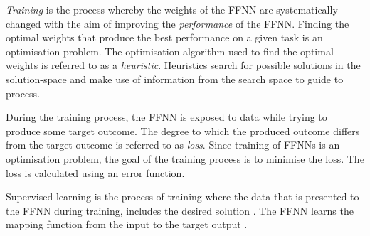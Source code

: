 \textit{Training} is the process whereby the weights of the \acs{FFNN} are systematically changed with the aim of improving the \textit{performance} of the \acs{FFNN}. Finding the optimal weights that produce the best performance on a given task is an optimisation problem. The optimisation algorithm used to find the optimal weights is referred to as a \textit{heuristic}. Heuristics search for possible solutions in the solution-space and make use of information from the search space to guide to process.

During the training process, the \acs{FFNN} is exposed to data while trying to produce some target outcome. The degree to which the produced outcome differs from the target outcome is referred to as \textit{loss}. Since training of \acp{FFNN} is an optimisation problem, the goal of the training process is to minimise the loss. The loss is calculated using an error function.

Supervised learning is the process of training where the data that is presented to the \acs{FFNN} during training, includes the desired solution  \cite{ref:geron:2017}. The \acs{FFNN} learns the mapping function from the input to the target output  \cite{ref:brownlee:2016}.
